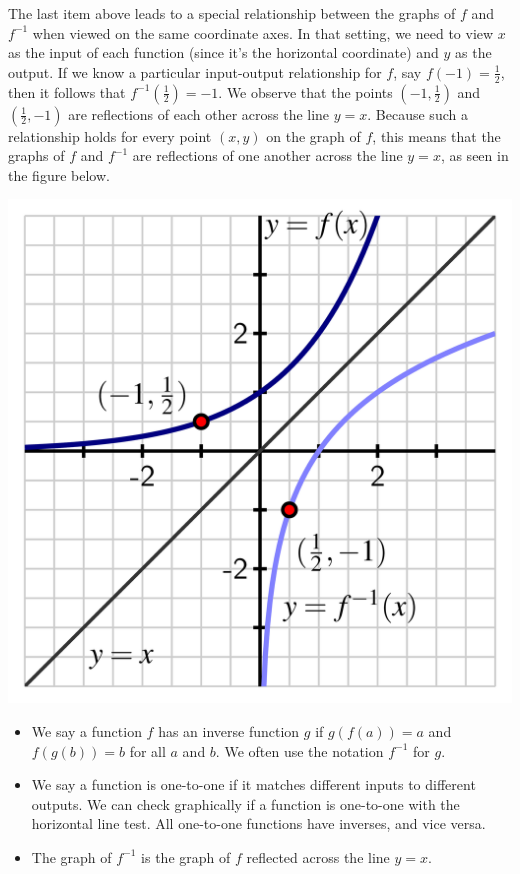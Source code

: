 \documentclass[nooutcomes]{ximera}
\begin{document}
The last item above leads to a special relationship between the graphs of $f$ and $f^{-1}$ when viewed on the same coordinate axes.  In that setting, we need to view $x$ as the input of each function (since it's the horizontal coordinate) and $y$ as the output.  If we know a particular input-output relationship for $f$, say $f(-1) = \frac{1}{2}$, then it follows that $f^{-1} \left( \frac{1}{2} \right) = -1$.  We observe that the points $\left(-1, \frac{1}{2} \right)$ and $\left(\frac{1}{2}, -1 \right)$ are reflections of each other across the line $y = x$.  Because such a relationship holds for every point $(x,y)$ on the graph of $f$, this means that the graphs of $f$ and $f^{-1}$ are reflections of one another across the line $y = x$, as seen in the figure below.

\begin{image}
\includegraphics[width=.7\textwidth]{inverse-plot-reflection.jpg}
\end{image}

\begin{summary}\begin{itemize}
\item We say a function $f$ has an inverse function $g$ if $g(f(a)) = a$ and $f(g(b)) = b$ for all $a$ and $b$. We often use the notation $f^{-1}$ for $g$.
\item We say a function is one-to-one if it matches different inputs to different outputs. We can check graphically if a function is one-to-one with the horizontal line test. All one-to-one functions have inverses, and vice versa. 
\item The graph of $f^{-1}$ is the graph of $f$ reflected across the line $y = x$.
\end{itemize}\end{summary}
\end{document}

